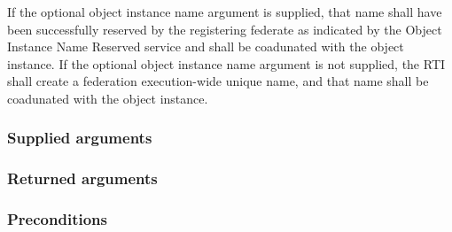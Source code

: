 \begin{compactstdpage}
    If the optional object instance name argument is supplied, that name shall have been successfully reserved by the registering federate as indicated by the Object Instance Name Reserved \rtiinitiated{} service and shall be coadunated with the object instance. If the optional object instance name argument is not supplied, the RTI shall create a federation execution-wide unique name, and that name shall be coadunated with the object instance.

    \subsubsection{Supplied arguments}



    \subsubsection{Returned arguments}



    \subsubsection{Preconditions}



\end{compactstdpage}

\clearpage

